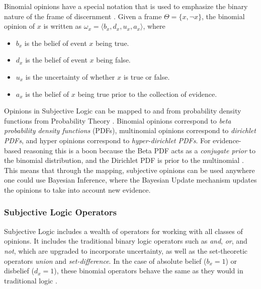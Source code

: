 \documentclass[thesis.tex]{subfiles}
\begin{document}
Binomial opinions have a special notation that is used to emphasize the binary nature of the frame of
discernment \cite{josang2001logic}. Given a frame $\Theta = \lbrace x, \lnot x \rbrace$, the binomial opinion of $x$ is written
as $\omega_x = \langle b_x, d_x, u_x, a_x \rangle$, where

\begin{itemize}
  \item $b_x$ is the belief of event $x$ being true.
  \item $d_x$ is the belief of event $x$ being false.
  \item $u_x$ is the uncertainty of whether $x$ is true or false.
  \item $a_x$ is the belief of $x$ being true prior to the collection of evidence.
\end{itemize}

Opinions in Subjective Logic can be mapped to and from probability density functions from Probability
Theory \cite{josang2001logic, josang2012interpretation}. Binomial opinions correspond to \emph{beta probability density functions} (PDFs),
multinomial opinions correspond to \emph{dirichlet PDFs}, and hyper opinions correspond
to \emph{hyper-dirichlet PDFs}. For evidence-based reasoning this is a boon because the
Beta PDF acts as a \emph{conjugate prior} to the binomial distribution, and
the Dirichlet PDF is prior to the multinomial \cite{schlaifer1961applied}. This means that through the mapping,
subjective opinions can be used anywhere one could use Bayesian Inference, where the Bayesian Update
mechanism updates the opinions to take into account new evidence.




\subsubsection{Subjective Logic Operators}

Subjective Logic includes a wealth of operators for working with all classes of opinions. It includes
the traditional binary logic operators such as \emph{and}, \emph{or}, and \emph{not}, which are
upgraded to incorporate uncertainty, as well as the set-theoretic operators \emph{union} and
\emph{set-difference}. In the case of absolute belief ($b_x = 1$) or disbelief ($d_x =1$), these
binomial operators behave the same as they would in traditional logic \cite{mcanally2004addition, josang2005multiplication}.
\end{document}
